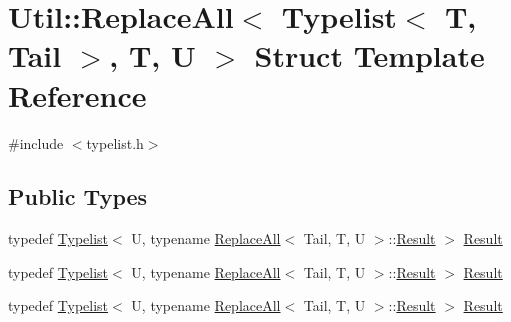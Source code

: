 \hypertarget{structUtil_1_1TL_1_1ReplaceAll_3_01Typelist_3_01T_00_01Tail_01_4_00_01T_00_01U_01_4}{}\section{Util\+:\+:Replace\+All$<$ Typelist$<$ T, Tail $>$, T, U $>$ Struct Template Reference}
\label{structUtil_1_1TL_1_1ReplaceAll_3_01Typelist_3_01T_00_01Tail_01_4_00_01T_00_01U_01_4}


{\ttfamily \#include $<$typelist.\+h$>$}

\subsection*{Public Types}
\begin{DoxyCompactItemize}
\item 
typedef \mbox{\hyperlink{structUtil_1_1Typelist}{Typelist}}$<$ U, typename \mbox{\hyperlink{structUtil_1_1TL_1_1ReplaceAll}{Replace\+All}}$<$ Tail, T, U $>$\+::\mbox{\hyperlink{structUtil_1_1TL_1_1ReplaceAll_3_01Typelist_3_01T_00_01Tail_01_4_00_01T_00_01U_01_4_ac7e5d69efc7e252ec9e6db5a6885ac44}{Result}} $>$ \mbox{\hyperlink{structUtil_1_1TL_1_1ReplaceAll_3_01Typelist_3_01T_00_01Tail_01_4_00_01T_00_01U_01_4_ac7e5d69efc7e252ec9e6db5a6885ac44}{Result}}
\item 
typedef \mbox{\hyperlink{structUtil_1_1Typelist}{Typelist}}$<$ U, typename \mbox{\hyperlink{structUtil_1_1TL_1_1ReplaceAll}{Replace\+All}}$<$ Tail, T, U $>$\+::\mbox{\hyperlink{structUtil_1_1TL_1_1ReplaceAll_3_01Typelist_3_01T_00_01Tail_01_4_00_01T_00_01U_01_4_ac7e5d69efc7e252ec9e6db5a6885ac44}{Result}} $>$ \mbox{\hyperlink{structUtil_1_1TL_1_1ReplaceAll_3_01Typelist_3_01T_00_01Tail_01_4_00_01T_00_01U_01_4_ac7e5d69efc7e252ec9e6db5a6885ac44}{Result}}
\item 
typedef \mbox{\hyperlink{structUtil_1_1Typelist}{Typelist}}$<$ U, typename \mbox{\hyperlink{structUtil_1_1TL_1_1ReplaceAll}{Replace\+All}}$<$ Tail, T, U $>$\+::\mbox{\hyperlink{structUtil_1_1TL_1_1ReplaceAll_3_01Typelist_3_01T_00_01Tail_01_4_00_01T_00_01U_01_4_ac7e5d69efc7e252ec9e6db5a6885ac44}{Result}} $>$ \mbox{\hyperlink{structUtil_1_1TL_1_1ReplaceAll_3_01Typelist_3_01T_00_01Tail_01_4_00_01T_00_01U_01_4_ac7e5d69efc7e252ec9e6db5a6885ac44}{Result}}
\end{DoxyCompactItemize}


